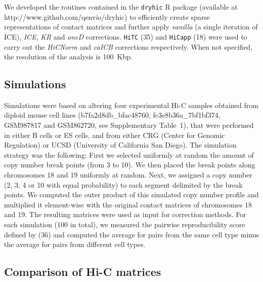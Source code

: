 \documentclass[a4,center,fleqn]{NAR}
\providecommand{\DIFadd}[1]{{\protect\color{red}#1}} %
\providecommand{\DIFdel}[1]{{\protect}}                      %
\providecommand{\DIFaddbegin}{} %
\providecommand{\DIFaddend}{} %
\providecommand{\DIFdelbegin}{} %
\providecommand{\DIFdelend}{} %
\begin{document}
We developed the routines contained in the \texttt{dryhic} R package
(available at http://www.github.com/qenvio/dryhic) to efficiently create
sparse representations of contact matrices and further apply
\textit{vanilla} \DIFaddbegin \DIFadd{(a single iteration of ICE)}\DIFaddend , \textit{ICE}, \textit{KR} and \textit{oneD} corrections.
\texttt{HiTC} (\DIFdelbegin \DIFdel{32}\DIFdelend \DIFaddbegin \DIFadd{35}\DIFaddend ) and \texttt{HiCapp}
(18) were used to carry out the \textit{\DIFdelbegin \DIFdel{LGF}\DIFdelend \DIFaddbegin \DIFadd{HiCNorm}\DIFaddend } and
\textit{caICB} corrections respectively. When not specified, the
resolution of the analysis is 100~Kbp.

\subsection{Simulations}


Simulations were based on altering four experimental Hi-C samples obtained
from diploid mouse cell lines (b7fa2d8db\_bfac48760, fc3e8b36a\_7bf1bf374,
GSM987817 and GSM862720, see Supplementary Table~1), that were performed
in either B cells or ES cells, and from either CRG \DIFdelbegin \DIFdel{or UCSC}\DIFdelend \DIFaddbegin \DIFadd{(Center for Genomic
Regulation) or UCSD (University of California San Diego)}\DIFaddend . The simulation
strategy was the following: First we selected uniformly at random the
amount of copy number break points (from 3 to 10). We then placed the
break points along chromosomes 18 and 19 uniformly at random. Next, we
assigned a copy number (2, 3, 4 or 10 with equal probability) to each
segment delimited by the break points. We computed the outer product of
this simulated copy number profile and multiplied it element-wise with the
original contact matrices of chromosomes 18 and 19. The resulting matrices
were used as input for correction methods. For each simulation (100 in
total), we measured the pairwise reproducibility score defined by
(\DIFdelbegin \DIFdel{33}\DIFdelend \DIFaddbegin \DIFadd{36}\DIFaddend ) and computed the average for pairs from the same
cell type minus the average for pairs from different cell types.

\subsection{Comparison of Hi-C matrices}
\end{document}
